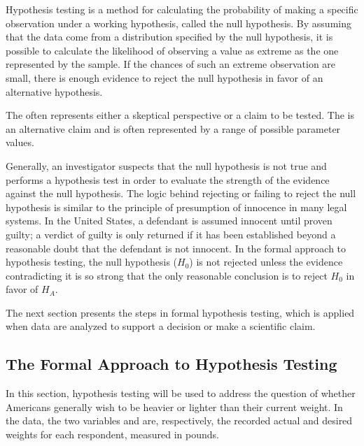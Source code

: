 Hypothesis testing is a method for calculating the probability of making a specific observation under a working hypothesis, called the null hypothesis. By assuming that the data come from a distribution specified by the null hypothesis, it is possible to calculate the likelihood of observing a value as extreme as the one represented by the sample. If the chances of such an extreme observation are small, there is enough evidence to reject the null hypothesis in favor of an alternative hypothesis. 

\begin{termBox}{
  {The  often represents either a skeptical perspective or a claim to be tested. The  is an alternative claim and is often represented by a range of possible parameter values.}}
\end{termBox}

Generally, an investigator suspects that the null hypothesis is not true and performs a hypothesis test in order to evaluate the strength of the evidence against the null hypothesis. The logic behind rejecting or failing to reject the null hypothesis is similar to the principle of presumption of innocence in many legal systems. In the United States, a defendant is assumed innocent until proven guilty; a verdict of guilty is only returned if it has been established beyond a reasonable doubt that the defendant is not innocent. In the formal approach to hypothesis testing, the null hypothesis ($H_0$) is not rejected unless the evidence contradicting it is so strong that the only reasonable conclusion is to reject $H_0$ in favor of $H_A$. 

The next section presents the steps in formal hypothesis testing, which is applied when data are analyzed to support a decision or make a scientific claim.


\subsection{The Formal Approach to Hypothesis Testing}
\label{formalHypothesisTesting}

In this section, hypothesis testing will be used to address the question of whether Americans generally wish to be heavier or lighter than their current weight. In the  data, the two variables  and  are, respectively, the recorded actual and desired weights for each respondent, measured in pounds. 

